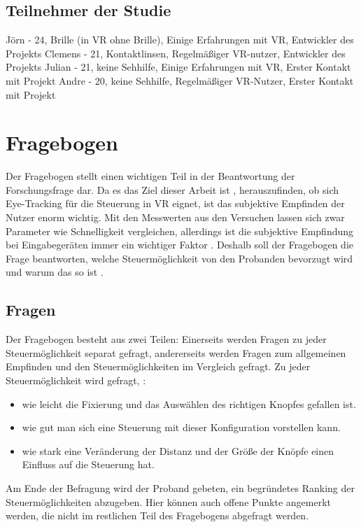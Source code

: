 \subsection{Teilnehmer der Studie}
Jörn - 24, Brille (in VR ohne Brille), Einige Erfahrungen mit VR, Entwickler des Projekts
Clemens - 21, Kontaktlinsen, Regelmäßiger VR-nutzer, Entwickler des Projekts
Julian - 21, keine Sehhilfe, Einige Erfahrungen mit VR, Erster Kontakt mit Projekt
Andre - 20, keine Sehhilfe, Regelmäßiger VR-Nutzer, Erster Kontakt mit Projekt

\section{Fragebogen} 
\label{section:fragebogen}
Der Fragebogen stellt einen wichtigen Teil in der Beantwortung der Forschungsfrage dar. Da es das Ziel dieser Arbeit ist , herauszufinden, ob sich Eye-Tracking für die Steuerung in VR eignet, ist das subjektive Empfinden der Nutzer enorm wichtig. Mit den Messwerten aus den Versuchen lassen sich zwar Parameter wie Schnelligkeit vergleichen, allerdings ist die subjektive Empfindung bei Eingabegeräten immer ein wichtiger Faktor . Deshalb soll der Fragebogen die Frage beantworten, welche Steuermöglichkeit von den Probanden bevorzugt wird und warum das so ist .
\subsection{Fragen}
Der Fragebogen besteht aus zwei Teilen: Einerseits werden Fragen zu jeder Steuermöglichkeit separat gefragt, andererseits werden Fragen zum allgemeinen Empfinden und den Steuermöglichkeiten im Vergleich gefragt.
Zu jeder Steuermöglichkeit wird gefragt, :
\begin{itemize}
	\item wie leicht die Fixierung und das Auswählen des richtigen Knopfes gefallen ist.
	\item wie gut man  sich eine Steuerung mit dieser Konfiguration vorstellen kann.
	\item wie stark eine Veränderung der Distanz und der Größe der Knöpfe einen Einfluss auf die Steuerung hat.
\end{itemize}
Am Ende der Befragung wird der Proband gebeten, ein begründetes Ranking der Steuermöglichkeiten abzugeben. Hier können auch offene Punkte angemerkt werden, die nicht im restlichen Teil des Fragebogens abgefragt werden.


